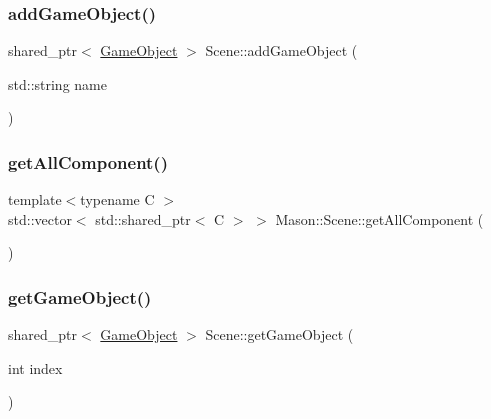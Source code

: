\subsubsection{\texorpdfstring{add\+Game\+Object()}{addGameObject()}}
{\footnotesize\ttfamily shared\+\_\+ptr$<$ \hyperlink{class_mason_1_1_game_object}{Game\+Object} $>$ Scene\+::add\+Game\+Object (\begin{DoxyParamCaption}\item[{std\+::string}]{name }\end{DoxyParamCaption})}

\hypertarget{class_mason_1_1_scene_a0766a39a27d936b12a93cb3f49ee32b0}{}\label{class_mason_1_1_scene_a0766a39a27d936b12a93cb3f49ee32b0} 
\subsubsection{\texorpdfstring{get\+All\+Component()}{getAllComponent()}}
{\footnotesize\ttfamily template$<$typename C $>$ \\
std\+::vector$<$ std\+::shared\+\_\+ptr$<$ C $>$ $>$ Mason\+::\+Scene\+::get\+All\+Component (\begin{DoxyParamCaption}{ }\end{DoxyParamCaption})}

\hypertarget{class_mason_1_1_scene_ae13738888d4f00135fb827639f87239b}{}\label{class_mason_1_1_scene_ae13738888d4f00135fb827639f87239b} 
\subsubsection{\texorpdfstring{get\+Game\+Object()}{getGameObject()}}
{\footnotesize\ttfamily shared\+\_\+ptr$<$ \hyperlink{class_mason_1_1_game_object}{Game\+Object} $>$ Scene\+::get\+Game\+Object (\begin{DoxyParamCaption}\item[{int}]{index }\end{DoxyParamCaption})}

\hypertarget{class_mason_1_1_scene_a045d786fa6f11ab01e190971637b15ce}{}\label{class_mason_1_1_scene_a045d786fa6f11ab01e190971637b15ce} 
